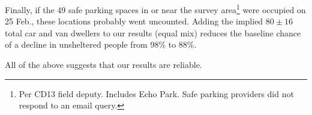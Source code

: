 \documentclass[11pt,twocolumn]{article}
\def\bfr{\bf\color{red}}
\begin{document}
Finally, if the 49 safe parking spaces in or near the survey area\footnote{Per CD13 field deputy. 
 Includes Echo Park. Safe parking providers did not respond to an email query.} 
were occupied on 25 Feb., these locations probably went uncounted. Adding the implied 
$80\pm16$ total car and van dwellers to our results (equal mix) reduces the baseline chance of a 
decline in unsheltered people from 98\% to 88\%. %

All of the above suggests that our results are reliable.

%
%
%



%
\end{document}
